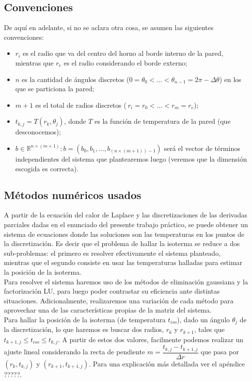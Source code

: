 \subsection{Convenciones}
De aquí en adelante, si no se aclara otra cosa, se asumen las siguientes convenciones:
\begin{itemize}
\item$r_i$ es el radio que va del centro del horno al borde interno de la pared, mientras que $r_e$ es el radio considerando el borde externo;
\item$n$ es la cantidad de ángulos discretos ($0=\theta_0 <\hdots< \theta_{n-1} = 2\pi - \Delta \theta$) en los que se particiona la pared;
\item$m+1$ es el total de radios discretos ($~{r_i=r_0<\hdots<r_m=r_e}$); 
\item$t_{k,j} = T(r_k, \theta_j)$, donde $T$ es la función de temperatura de la pared (que desconocemos);
\item$b\in \mathbb{R}^{n\times (m+1)}: b = (b_0, b_1, \hdots, b_{(n\times (m+1))-1})$ será el vector de términos independientes del sistema que plantearemos luego (veremos que la dimensión escogida es correcta). 
\end{itemize}
\subsection{Métodos numéricos usados}
\label{sec:metodos}
A partir de la ecuación del calor de Laplace y las discretizaciones de las derivadas parciales dadas en el enunciado del presente trabajo práctico, se puede obtener un sistema de ecuaciones donde las soluciones son las temperaturas en los puntos de la discretización. 
Es decir que el problema de hallar la isoterma se reduce a dos sub-problemas: el primero es resolver efectivamente el sistema planteado, mientras que el segundo consiste en usar las temperaturas halladas para estimar la posición de la isoterma.\\
Para resolver el sistema haremos uso de los métodos de eliminación gaussiana y la factorización LU, para luego poder contrastar su eficiencia ante distintas situaciones. Adicionalmente, realizaremos una variación de cada método para aprovechar una de las características propias de la matriz del sistema.\\
Para hallar la posición de la isoterma (de temperatura $t_{iso}$), dado un ángulo $\theta_j$ de la discretización, lo que haremos es buscar dos radios, $r_k$ y $r_{k+1}$, tales que $t_{k+1,j} \leq t_{iso} \leq t_{k, j}$. A partir de estos dos valores, facilmente podemos realizar un ajuste lineal considerando la recta de pendiente $m = \dfrac{t_{k,j}-t_{k+1,j}}{\Delta r}$ que pasa por $(r_k,t_{k,j})$ y $(r_{k+1}, t_{k+1,j})$. Para una explicación más detallada ver el apéndice ?????.

